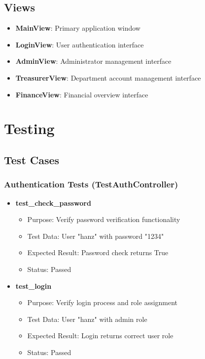 \documentclass[a4paper,11pt]{article}
\begin{document}
\subsection{Views}
\begin{itemize}
\item \textbf{MainView}: Primary application window
\item \textbf{LoginView}: User authentication interface
\item \textbf{AdminView}: Administrator management interface
\item \textbf{TreasurerView}: Department account management interface
\item \textbf{FinanceView}: Financial overview interface
\end{itemize}

\section{Testing}

\subsection{Test Cases}

\subsubsection{Authentication Tests (TestAuthController)}
\begin{itemize}
\item \textbf{test\_check\_password}
  \begin{itemize}
  \item Purpose: Verify password verification functionality
  \item Test Data: User "hanz" with password "1234"
  \item Expected Result: Password check returns True
  \item Status: Passed
  \end{itemize}

\item \textbf{test\_login}
  \begin{itemize}
  \item Purpose: Verify login process and role assignment
  \item Test Data: User "hanz" with admin role
  \item Expected Result: Login returns correct user role
  \item Status: Passed
  \end{itemize}
\end{itemize}
\end{document}
